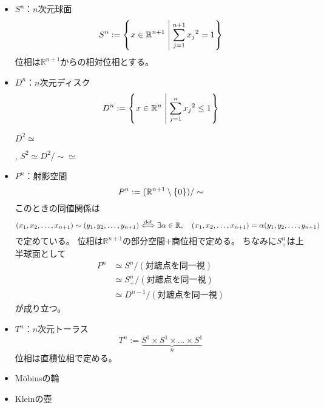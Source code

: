 \documentclass[uplatex]{jsarticle}
\begin{document}
\begin{itemize}
  \vspace{-0.5\baselineskip}
  \item $S^{n}$：$n$次元球面
  \begin{equation}
    S^{n} := \Set{\hspace{-1.8pt} x \in \mathbb{R}^{n+1} | \sum_{j=1}^{n+1} {x_{j}}^{2} = 1 \hspace{-1.8pt}}
  \end{equation}
  位相は$\mathbb{R}^{n+1}$からの相対位相とする。

  \item $D^{n}$：$n$次元ディスク
  \begin{equation}
    D^{n} := \Set{\hspace{-1.8pt} x \in \mathbb{R}^{n} | \sum_{j=1}^{n} {x_{j}}^{2} \le 1 \hspace{-1.8pt}}
  \end{equation}

  \begin{center}
    $D^{2} \simeq$
      , \quad $S^{2} \simeq {D^{2} / \sim} \simeq$
  \end{center}

  \item $P^{n}$：射影空間
  \begin{equation}
    P^{n} := (\mathbb{R}^{n+1} \setminus \Set{\hspace{-1.8pt} 0 \hspace{-1.8pt}}) / \sim
  \end{equation}
  このときの同値関係は
  \begin{equation}
    (x_{1},x_{2},\dots,x_{n+1}) \sim (y_{1},y_{2},\dots,y_{n+1}) \overset{\mathrm{def}}{\Longleftrightarrow} \exists \alpha \in \mathbb{R}, \quad (x_{1},x_{2},\dots,x_{n+1}) = \alpha (y_{1},y_{2},\dots,y_{n+1})
  \end{equation}
  で定めている。
  位相は$\mathbb{R}^{n+1}$の部分空間$+$商位相で定める。
  ちなみに$S_{+}^{n}$は上半球面として
  \begin{align}
    P^{n} &\simeq S^{n} / (\text{対蹠点を同一視}) \\
    &\simeq S_{+}^{n} / (\text{対蹠点を同一視}) \\
    &\simeq D^{n-1} / (\text{対蹠点を同一視})
  \end{align}
  が成り立つ。

  \item $T^{n}$：$n$次元トーラス
  \begin{equation}
    T^{n} := \underbrace{S^{1} \times S^{1} \times \dots \times S^{1}}_{n}
  \end{equation}
  位相は直積位相で定める。

  \item M\"obiusの輪
  \item Kleinの壺
  \vspace{-0.5\baselineskip}
\end{itemize}
\end{document}
